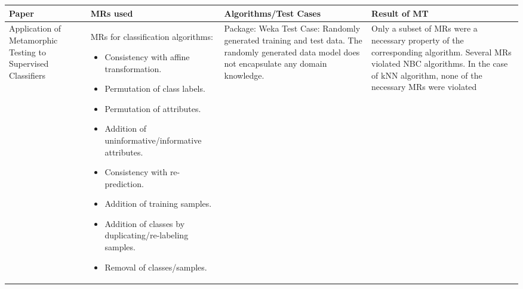 
\begin{singlespace}
\begin{tabularx}{\textwidth}{|X|X|X|X|}
 \hline
  Paper    & MRs used & Algorithms/Test Cases & Result of MT  \\ \hline
  Application of Metamorphic Testing to Supervised Classifiers &
  MRs for classification algorithms:
  \begin{itemize}[leftmargin=10pt, labelindent=0pt, itemindent=0pt]
    \item Consistency with affine transformation.
    \item Permutation of class labels.
    \item Permutation of attributes.
    \item Addition of uninformative/informative attributes.
    \item Consistency with re-prediction.
    \item Addition of training samples.
    \item Addition of classes by duplicating/re-labeling samples.
    \item Removal of classes/samples.
  \end{itemize}
  & Package: Weka
  Test Case: Randomly generated training and test data. The randomly generated data model does not encapsulate any domain knowledge.
  & Only a subset of MRs were a necessary property of the corresponding algorithm.  Several MRs violated NBC algorithms.  In the case of kNN algorithm, none of the necessary MRs were violated \\
  \hline
\end{tabularx}
\end{singlespace}
